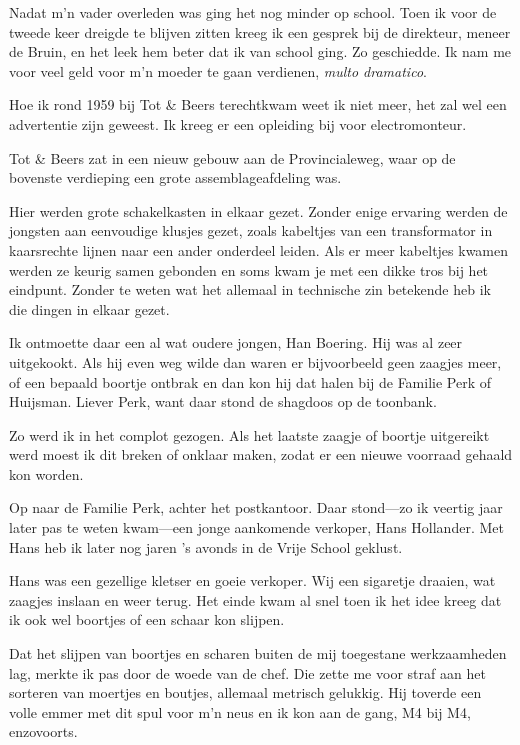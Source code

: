 \documentclass[10pt,twoside,openright]{memoir}
\begin{document}
Nadat m’n vader overleden was ging het nog minder op school. Toen ik voor de tweede keer dreigde te blijven zitten kreeg ik een gesprek bij de direkteur, meneer de Bruin, en het leek hem beter dat ik van school ging. Zo geschiedde. Ik nam me voor veel geld voor m’n moeder te gaan verdienen, \emph{multo dramatico}.

Hoe ik rond 1959 bij Tot \& Beers terechtkwam weet ik niet meer, het zal wel een advertentie zijn geweest. Ik kreeg er een opleiding bij voor electromonteur.

Tot \& Beers zat in een nieuw gebouw aan de Provincialeweg, waar op de bovenste verdieping een grote assemblageafdeling was. 

Hier werden grote schakelkasten in elkaar gezet. Zonder enige ervaring werden de jongsten aan eenvoudige klusjes gezet, zoals kabeltjes van een transformator in kaarsrechte lijnen naar een ander onderdeel leiden. Als er meer kabeltjes kwamen werden ze keurig samen gebonden en soms kwam je met een dikke tros bij het eindpunt. Zonder te weten wat het allemaal in technische zin betekende heb ik die dingen in elkaar gezet. 

Ik ontmoette daar een al wat oudere jongen, Han Boering. Hij was al zeer uitgekookt. Als hij even weg wilde dan waren er bijvoorbeeld geen zaagjes meer, of een bepaald boortje ontbrak en dan kon hij dat halen bij de Familie Perk of Huijsman. Liever Perk, want daar stond de shagdoos op de toonbank. 

Zo werd ik in het complot gezogen. Als het laatste zaagje of boortje uitgereikt werd moest ik dit breken of onklaar maken, zodat er een nieuwe voorraad gehaald kon worden. 

Op naar de Familie Perk, achter het postkantoor. Daar stond---zo ik veertig jaar later pas te weten kwam---een jonge aankomende verkoper, Hans Hollander. Met Hans heb ik later nog jaren ’s avonds in de Vrije School geklust. 

Hans was een gezellige kletser en goeie verkoper. Wij een sigaretje draaien, wat zaagjes inslaan en weer terug. Het einde kwam al snel toen ik het idee kreeg dat ik ook wel boortjes of een schaar kon slijpen. 

Dat het slijpen van boortjes en scharen buiten de mij toegestane werkzaamheden lag, merkte ik pas door de woede van de chef. Die zette me voor straf aan het sorteren van moertjes en boutjes, allemaal metrisch gelukkig. Hij toverde een volle emmer met dit spul voor m’n neus en ik kon aan de gang, M4 bij M4, enzovoorts. 
\end{document}
